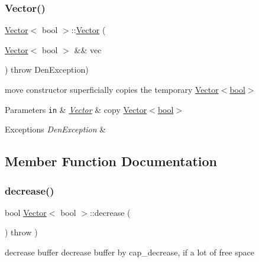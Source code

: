 \subsubsection{\texorpdfstring{Vector()}{Vector()}\hspace{0.1cm}{\footnotesize\ttfamily [5/5]}}
{\footnotesize\ttfamily \hyperlink{classVector}{Vector}$<$ bool $>$\+::\hyperlink{classVector}{Vector} (\begin{DoxyParamCaption}\item[{\hyperlink{classVector}{Vector}$<$ bool $>$ \&\&}]{vec }\end{DoxyParamCaption}) throw  Den\+Exception) }



move constructor  superficially copies the temporary \hyperlink{classVector_3_01bool_01_4}{Vector$<$bool$>$} 


\begin{DoxyParams}[1]{Parameters}
\mbox{\tt in}  & {\em \hyperlink{classVector}{Vector}} & copy \hyperlink{classVector_3_01bool_01_4}{Vector$<$bool$>$} \\
\hline
\end{DoxyParams}

\begin{DoxyExceptions}{Exceptions}
{\em Den\+Exception} & \\
\hline
\end{DoxyExceptions}


\subsection{Member Function Documentation}
\mbox{\label{classVector_3_01bool_01_4_a39afbd4a74eac5e2eb4363eed1f98adf}} 
\subsubsection{\texorpdfstring{decrease()}{decrease()}}
{\footnotesize\ttfamily bool \hyperlink{classVector}{Vector}$<$ bool $>$\+::decrease (\begin{DoxyParamCaption}{ }\end{DoxyParamCaption}) throw  ) \hspace{0.3cm}{\ttfamily [private]}}



decrease buffer  decrease buffer by cap\+\_\+decrease, if a lot of free space 


